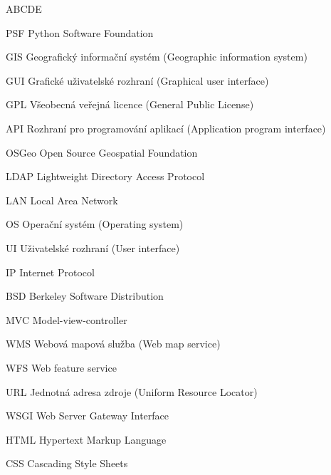 
\begin{seznamzkratek}{ABCDE}      
	      
		  {PSF}
	      {Python Software Foundation}

	      {GIS}
	      {Geografický informační systém (Geographic information system)}
	         
	      {GUI}
	      {Grafické uživatelské rozhraní (Graphical user interface)}

	      {GPL}
	      {Všeobecná veřejná licence (General Public License)}
	      
	      {API}
	      {Rozhraní pro programování aplikací (Application program interface)}	      
	    
	      {OSGeo}
	      {Open Source Geospatial Foundation}
	      
	      {LDAP}
	      {Lightweight Directory Access Protocol} 
	      
	      {LAN}
	      {Local Area Network} 
	      	       
	      {OS}
	      {Operační systém (Operating system)} 

	      {UI}
	      {Uživatelské rozhraní (User interface)} 
	      
	      {IP}
	      {Internet Protocol} 	      	     

	      {BSD}
	      {Berkeley Software Distribution} 	

	      {MVC}
	      {Model-view-controller} 	

	      {WMS}
	      {Webová mapová služba (Web map service)} 	

	      {WFS}
	      {Web feature service} 	

	      {URL}
	      {Jednotná adresa zdroje (Uniform Resource Locator)}

	      {WSGI}
	      {Web Server Gateway Interface}

	      {HTML}
	      {Hypertext Markup Language}

	      {CSS}
	      {Cascading Style Sheets}
	      	      
\end{seznamzkratek}